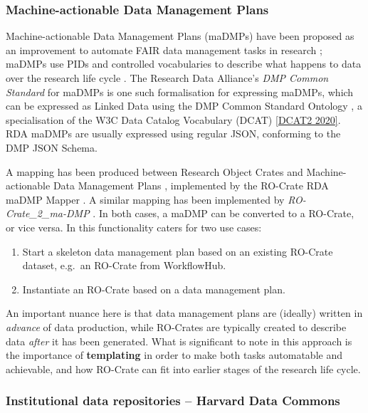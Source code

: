 {\hypertarget{dmp}{%
\subsubsection{Machine-actionable Data Management Plans}\label{dmp}}

Machine-actionable Data Management Plans (maDMPs) have been proposed as
an improvement to automate FAIR data management tasks in research
\cite{ch5-88}; maDMPs
use PIDs and controlled vocabularies to describe what happens to data
over the research life cycle
\cite{Cardoso 2020a}. The
Research Data Alliance's \emph{DMP Common Standard} for maDMPs
\cite{ch5-121} is one such
formalisation for expressing maDMPs, which can be expressed as Linked
Data using the DMP Common Standard Ontology
\cite{Cardoso 2020b}, a
specialisation of the W3C Data Catalog Vocabulary (DCAT)
\href{https://www.w3.org/TR/2020/REC-vocab-dcat-2-20200204/}{{[}DCAT2 2020{]}}.
RDA maDMPs are usually expressed using regular JSON, conforming to the
DMP JSON Schema.

A mapping has been produced between Research Object Crates and
Machine-actionable Data Management Plans
\cite{ch5-87}, implemented by
the RO-Crate RDA maDMP Mapper
\cite{ch5-7}. A similar
mapping has been implemented by \emph{RO-Crate\_2\_ma-DMP}
\cite{Brenner 2020}. In both cases,
a maDMP can be converted to a RO-Crate, or vice versa. In
\cite{ch5-87} this
functionality caters for two use cases:

\begin{enumerate}
\def\labelenumi{\arabic{enumi}.}
\tightlist
\item
  Start a skeleton data management plan based on an existing RO-Crate
  dataset, e.g.~an RO-Crate from WorkflowHub.
\item
  Instantiate an RO-Crate based on a data management plan.
\end{enumerate}

An important nuance here is that data management plans are (ideally)
written in \emph{advance} of data production, while RO-Crates are
typically created to describe data \emph{after} it has been generated.
What is significant to note in this approach is the importance of
\textbf{templating} in order to make both tasks automatable and
achievable, and how RO-Crate can fit into earlier stages of the research
life cycle.

\hypertarget{institutionalrepos}{%
\subsubsection{Institutional data repositories -- Harvard Data
Commons}\label{institutionalrepos}}

}
